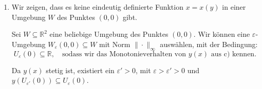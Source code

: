 \documentclass[a4paper,12pt]{article}
\begin{document}
\begin{enumerate}[label=\alph*)]
    Daraus folgt
    \[
        \lim_{x \to 0} \frac{y(x)}{x} = \lim_{x \to 0} \frac{y(x) - y(0)}{x - 0} = y'(0) = 0
    \]
    Nach dem $\varepsilon$-$\delta$-Kriterium existiert also ein $\delta > 0$, sodass $\frac{|y(x)|}{|x|} < 1$ und demnach $|y(x)| < |x|$ für alle $|x| < \delta$ gilt.

    Wir betrachten $y'(x)$ in der Umgebung
    \[
        U' := U \cap U_\delta(0) \cap U_1(0)
    \]

    Nach Satz 4.2.3(ii) gilt:
    \begin{align*}
        y'(x) &= -\left[ F_y'(x, y(x)) \right]^{-1} F_x'(0,0) \\
              &= -\frac{1}{D_2 F(x, y(x))} D_1 F(x, y(x)) \\
              &= -\frac{2x + y(x) \cos(x\,y(x))}{1 + x\cos(x\,y(x))}
    \end{align*}

    Wegen $x \in U_1(0)$, also $|x| < 1$ folgt
    \[
        1 + x\cos(x\,y(x)) > 0
    \]
    Der Nenner von $y'(x)$ ist also positiv für alle $x \in U'$!

    Außerdem gilt wegen $|y(x)| < |x|$
    \[
        y(x) \cos(x\,y(x)) \leq |y(x)| < |x| < |2x|.
    \]

    Mit den Abschätzungen können wir schließen
    \begin{align*}
        y'(x) &< 0 \quad \forall\, x \in U' \cap (0,1) \\
        y'(x) &> 0 \quad \forall\, x \in U' \cap (-1,0)
    \end{align*}

    Die Funktion $y|_{U' \cap (0,1)}$ ist demnach streng monoton fallend und $y|_{U' \cap (-1,0)}$ streng monoton steigend.

    \item
    Wir zeigen, dass es keine eindeutig definierte Funktion $x = x(y)$ in einer Umgebung $W$ des Punktes $(0,0)$ gibt.

    Sei $W \subseteq \mathbb{R}^2$ eine beliebige Umgebung des Punktes $(0,0)$. Wir können eine $\varepsilon$-Umgebung $W_\varepsilon(0,0) \subseteq W$ mit Norm $\|\cdot\|_\infty$ auswählen, mit der Bedingung:
    \[
        U_\varepsilon(0) \subseteq \mathbb{R}, \quad\text{sodass wir das Monotonieverhalten von } y(x) \text{ aus c) kennen.}
    \]

    Da $y(x)$ stetig ist, existiert ein $\varepsilon' > 0$, mit $\varepsilon > \varepsilon' > 0$ und $y(U_{\varepsilon'}(0)) \subseteq U_\varepsilon(0)$.


\end{enumerate}
\end{document}
